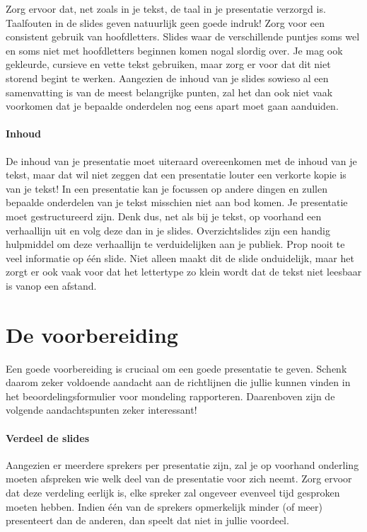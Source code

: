 \documentclass[a4paper]{article}
\begin{document}
Zorg ervoor dat, net zoals in je tekst, de taal in je presentatie verzorgd is.
Taalfouten in de slides geven natuurlijk geen goede indruk!
Zorg voor een consistent gebruik van hoofdletters.
Slides waar de verschillende puntjes soms wel en soms niet met hoofdletters beginnen komen nogal slordig over.
Je mag ook gekleurde, cursieve en vette tekst gebruiken, maar zorg er voor dat dit niet storend begint te werken.
Aangezien de inhoud van je slides sowieso al een samenvatting is van de meest belangrijke punten, zal het dan ook niet vaak voorkomen dat je bepaalde onderdelen nog eens apart moet gaan aanduiden.


\paragraph{Inhoud}

De inhoud van je presentatie moet uiteraard overeenkomen met de inhoud van je tekst, maar dat wil niet zeggen dat een presentatie louter een verkorte kopie is van je tekst!
In een presentatie kan je focussen op andere dingen en zullen bepaalde onderdelen van je tekst misschien niet aan bod komen.
Je presentatie moet gestructureerd zijn.
Denk dus, net als bij je tekst, op voorhand een verhaallijn uit en volg deze dan in je slides.
Overzichtslides zijn een handig hulpmiddel om deze verhaallijn te verduidelijken aan je publiek.
Prop nooit te veel informatie op één slide.
Niet alleen maakt dit de slide onduidelijk, maar het zorgt er ook vaak voor dat het lettertype zo klein wordt dat de tekst niet leesbaar is vanop een afstand.


\section{De voorbereiding}

Een goede voorbereiding is cruciaal om een goede presentatie te geven.
Schenk daarom zeker voldoende aandacht aan de richtlijnen die jullie kunnen vinden in het beoordelingsformulier voor mondeling rapporteren.
Daarenboven zijn de volgende aandachtspunten zeker interessant!


\paragraph{Verdeel de slides}

Aangezien er meerdere sprekers per presentatie zijn, zal je op voorhand onderling moeten afspreken wie welk deel van de presentatie voor zich neemt.
Zorg ervoor dat deze verdeling eerlijk is, elke spreker zal ongeveer evenveel tijd gesproken moeten hebben.
Indien één van de sprekers opmerkelijk minder (of meer) presenteert dan de anderen, dan speelt dat niet in jullie voordeel.
\end{document}
